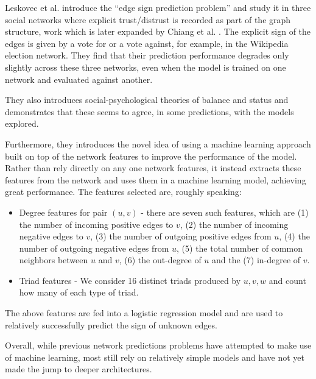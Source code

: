 \documentclass[letterpaper, 10 pt, conference]{ieeeconf}  %
\begin{document}
Leskovec et al. introduce the ``edge sign prediction problem'' and study it in three social networks where explicit trust/distrust is recorded as part of the graph structure, work which is later expanded by Chiang et al. \cite{Chiang:2011:ELC:2063576.2063742}. The explicit sign of the edges is given by a vote for or a vote against, for example, in the Wikipedia election network. They find that their prediction performance degrades only slightly across these three networks, even when the model is trained on one network and evaluated against another.

They also introduces social-psychological theories of balance and status and demonstrates that these seems to agree, in some predictions, with the models explored.

Furthermore, they introduces the novel idea of using a machine learning approach built on top of the network features to improve the performance of the model. Rather than rely directly on any one network features, it instead extracts these features from the network and uses them in a machine learning model, achieving great performance. The features selected are, roughly speaking:

\begin{itemize}
\item Degree features for pair $(u,v)$ - there are seven such features, which are (1) the number of incoming positive edges to $v$, (2) the number of incoming negative edges to $v$, (3) the number of outgoing positive edges from $u$, (4) the number of outgoing negative edges from $u$, (5) the total number of common neighbors between $u$ and $v$, (6) the out-degree of $u$ and the (7) in-degree of $v$.
\item Triad features - We consider 16 distinct triads produced by $u,v,w$ and count how many of each type of triad.
\end{itemize}

The above features are fed into a logistic regression model and are used to relatively successfully predict the sign of unknown edges.

Overall, while previous network predictions problems have attempted to make use of machine learning, most still rely on relatively simple models and have not yet made the jump to deeper architectures.
\end{document}

